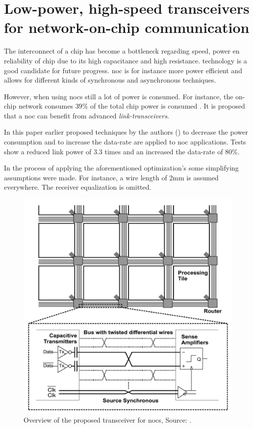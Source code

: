 \section{Low-power, high-speed transceivers for network-on-chip
communication \cite{schinkel2009low}} \label{ss:schinkel2009low}
The interconnect of a chip has become a bottleneck regarding speed, power en reliability of chip due to its high capacitance and high resistance.  technology is a good candidate for future progress.
\ac{noc} is for instance more power efficient and allows for different kinds of synchronous and asynchronous techniques.

\motive
However, when using \acsp{noc} still a lot of power is consumed.
For instance, the on-chip network consumes $39\%$ of the total chip power is consumed \cite{vangal20075}.
It is proposed that a \ac{noc} can benefit from advanced \textit{link-transceivers}.

\objective
In this paper earlier proposed techniques by the authors (\cite{mensink20070}) to decrease the power consumption and to increase the data-rate are applied to \ac{noc} applications.
Tests show a reduced link power of 3.3 times and an increased the data-rate of 80\%.

\summary
In the process of applying the aforementioned optimization's some simplifying assumptions were made. 
For instance, a wire length of 2mm is assumed everywhere. 
The receiver equalization is omitted.

\begin{figure}	\centering
	
	\includegraphics[width=0.78\linewidth]{Figures/Rep2Overview.png}
	\caption{Overview of the proposed transceiver for \acsp{noc}, Source: \cite{schinkel2009low}.} 
    \label{fig:rep2:overview}
\end{figure}

